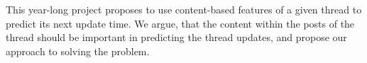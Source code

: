  This year-long project proposes to use content-based features of a given thread 
to predict its next update time. We argue, that the content within the posts of 
the thread should be important in predicting the thread updates, and propose our 
approach to solving the problem.

